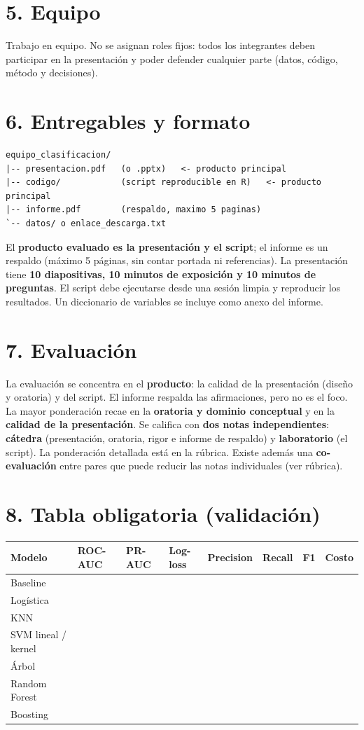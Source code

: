\documentclass[11pt,letterpaper]{article}
\begin{document}
\section*{5. Equipo}
Trabajo en equipo. No se asignan roles fijos: todos los integrantes deben participar en la presentación y poder defender cualquier parte (datos, código, método y decisiones).

\section*{6. Entregables y formato}
\begin{verbatim}
equipo_clasificacion/
|-- presentacion.pdf   (o .pptx)   <- producto principal
|-- codigo/            (script reproducible en R)   <- producto principal
|-- informe.pdf        (respaldo, maximo 5 paginas)
`-- datos/ o enlace_descarga.txt
\end{verbatim}
El \textbf{producto evaluado es la presentación y el script}; el informe es un respaldo (máximo 5 páginas, sin
contar portada ni referencias). La presentación tiene \textbf{10 diapositivas, 10 minutos de exposición y 10
minutos de preguntas}. El script debe ejecutarse desde una sesión limpia y reproducir los resultados. Un
diccionario de variables se incluye como anexo del informe.

\section*{7. Evaluación}
La evaluación se concentra en el \textbf{producto}: la calidad de la presentación (diseño y oratoria) y del
script. El informe respalda las afirmaciones, pero no es el foco. La mayor ponderación recae en la
\textbf{oratoria y dominio conceptual} y en la \textbf{calidad de la presentación}. Se califica con \textbf{dos notas independientes}: \textbf{cátedra} (presentación, oratoria, rigor e informe de respaldo) y \textbf{laboratorio} (el script). La ponderación detallada está en la rúbrica. Existe además una \textbf{co-evaluación} entre pares que puede reducir las notas individuales (ver rúbrica).

\section*{8. Tabla obligatoria (validación)}
\begin{center}\small
\begin{tabular}{llllllll}
\toprule
Modelo & ROC-AUC & PR-AUC & Log-loss & Precision & Recall & F1 & Costo \\
\midrule
Baseline & & & & & & & \\
Logística & & & & & & & \\
KNN & & & & & & & \\
SVM lineal / kernel & & & & & & & \\
Árbol & & & & & & & \\
Random Forest & & & & & & & \\
Boosting & & & & & & & \\
\bottomrule
\end{tabular}\end{center}
\end{document}
